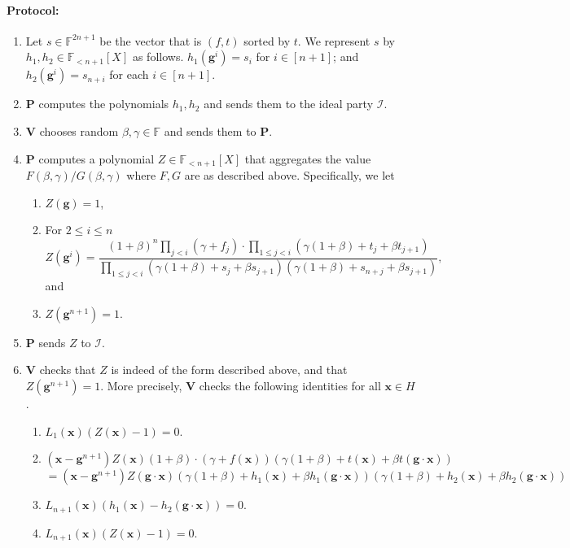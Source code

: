 \documentclass[11pt]{article} %
\newcommand{\F}{\ensuremath{\mathbb F}\xspace}
\newcommand{\dom}{\ensuremath{H}\xspace}
\newcommand{\prv}{\ensuremath{\mathsf{\mathbf{P}}}\xspace}
\newcommand{\prvpoly}{\ensuremath{\prv}\xspace}
\newcommand{\verpoly}{\ensuremath{\ver}\xspace}%
\newcommand{\ideal}{\ensuremath{\mathcal{I}}\xspace}
\newcommand{\ver}{\ensuremath{\mathsf{\mathbf{V}}}\xspace}
\newcommand{\hgen}{\ensuremath{\mathbf{g}}\xspace}
\newcommand{\cosetgen}{\ensuremath{\mathbf{\kappa}}\xspace}
\newcommand{\polysofdeg}[1]{\ensuremath{\F_{< #1}[X]}\xspace}
\newcommand{\sone}{\ensuremath{ h_1}\xspace}
\newcommand{\stwo}{\ensuremath{ h_{2}}\xspace}
\newcommand{\X}{\ensuremath{ {\mathbf{x}}}\xspace}
\begin{document}
\paragraph{Protocol:}
\begin{enumerate}
 \item Let $s\in \F^{2n+1}$ be the vector that is $(f,t)$ sorted by $t$. We represent $s$ by $\sone,\stwo \in \polysofdeg{n+1}$ as follows.
$\sone (\hgen^i) = s_i$ for $i\in [n+1]$; and $\stwo(\hgen ^i)= s_{n+i}$ for each $i\in [n+1]$.
 
 \item \prvpoly computes the polynomials $\sone,\stwo$ and sends them to the ideal party \ideal.
 \item \verpoly chooses random $\beta,\gamma \in \F$ and sends them to \prvpoly.
 \item \prvpoly computes a polynomial $Z\in \polysofdeg{n+1}$ that aggregates the value $F(\beta,\gamma)/G(\beta,\gamma)$ where $F,G$ are as described above. Specifically, we let
\begin{enumerate}
 \item  $Z(\hgen) = 1$,
\item For $2\leq i \leq n$
\[Z(\hgen^{i})= \frac{(1+\beta)^n \prod_{j < i} (\gamma + f_j)\cdot \prod_{1\leq j < i} (\gamma(1+\beta)+ t_j + \beta t_{j+1})}{\prod_{1\leq j <i} (\gamma(1+\beta)+ s_j + \beta s_{j+1})(\gamma(1+\beta)+ s_{n+j} + \beta s_{j+1})},\]
 and
\item $Z(\hgen^{n+1})=1$.
\end{enumerate}
 \item \prvpoly sends $Z$ to \ideal.
 \item \verpoly checks that $Z$ is indeed of the form described above, and that $Z(\hgen^{n+1})=1$. More precisely, \verpoly checks the following identities for all $\X\in H$.
 \begin{enumerate}
  \item $L_1(\X)(Z(\X)-1)= 0$.
  \item 
  \[(\X-\hgen^{n+1})Z(\X)(1+\beta)\cdot (\gamma + f(\X))(\gamma(1+\beta)+ t(\X)+\beta t(\hgen \cdot \X) )\]
  \[= (\X-\hgen^{n+1}) Z(\hgen\cdot \X)(\gamma(1+\beta)+ \sone(\X)+\beta \sone(\hgen \cdot \X))(\gamma(1+\beta)+ \stwo(\X)+\beta \stwo(\hgen \cdot \X))\]
  \item\label{check:consist} $L_{n+1}(\X)(\sone(\X)-\stwo(\hgen \cdot \X))= 0$.
  \item $L_{n+1}(\X)(Z(\X)-1)= 0$.
 

\end{enumerate}
\end{enumerate}
\end{document}
